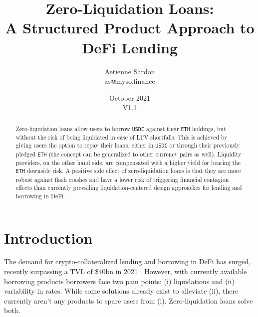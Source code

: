 \documentclass[a4paper]{article}
\title{Zero-Liquidation Loans:\\A Structured Product Approach to DeFi Lending}
\author{Aetienne Sardon\\\small{as@myso.finance}}
\date{October 2021\\\small{V1.1}}
\begin{document}
\maketitle




\begin{abstract}
Zero-liquidation loans allow users to borrow \verb|USDC| against their \verb|ETH| holdings, but without the risk of being liquidated in case of LTV shortfalls. This is achieved by giving users the option to repay their loans, either in \verb|USDC| or through their previously pledged \verb|ETH| (the concept can be generalized to other currency pairs as well). Liquidity providers, on the other hand side, are compensated with a higher yield for bearing the \verb|ETH| downside risk. A positive side effect of zero-liquidation loans is that they are more robust against flash crashes and have a lower risk of triggering financial contagion effects than currently prevailing liquidation-centered design approaches for lending and borrowing in DeFi. %
\end{abstract}

\section{Introduction}
The demand for crypto-collateralized lending and borrowing in DeFi has surged, recently surpassing a TVL of \$40bn in 2021 \cite{aave} \cite{compound}. However, with currently available borrowing products borrowers face two pain points: (i) liquidations and (ii) variability in rates. While some solutions already exist to alleviate (ii), there currently aren't any products to spare users from (i). Zero-liquidation loans solve both.\\
\end{document}
